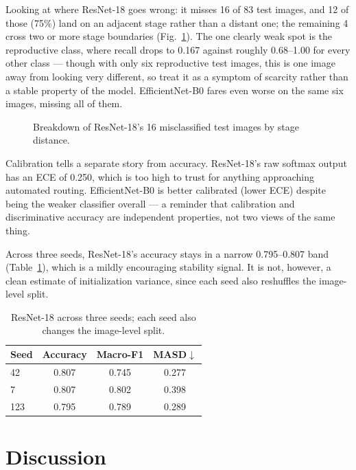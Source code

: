 \documentclass{llncs}
\begin{document}
Looking at where ResNet-18 goes wrong: it misses 16 of 83 test images, and 12 of those (75\%) land on an adjacent stage rather than a distant one; the remaining 4 cross two or more stage boundaries (Fig.~\ref{fig:errors}). The one clearly weak spot is the reproductive class, where recall drops to 0.167 against roughly 0.68--1.00 for every other class — though with only six reproductive test images, this is one image away from looking very different, so treat it as a symptom of scarcity rather than a stable property of the model. EfficientNet-B0 fares even worse on the same six images, missing all of them.

\begin{figure}[t]
\centering
\resizebox{0.5\textwidth}{!}{}
\caption{Breakdown of ResNet-18's 16 misclassified test images by stage distance.}
\label{fig:errors}
\end{figure}

Calibration tells a separate story from accuracy. ResNet-18's raw softmax output has an ECE of 0.250, which is too high to trust for anything approaching automated routing. EfficientNet-B0 is better calibrated (lower ECE) despite being the weaker classifier overall — a reminder that calibration and discriminative accuracy are independent properties, not two views of the same thing.

Across three seeds, ResNet-18's accuracy stays in a narrow 0.795--0.807 band (Table~\ref{tab:seeds}), which is a mildly encouraging stability signal. It is not, however, a clean estimate of initialization variance, since each seed also reshuffles the image-level split.

\begin{table}[t]
\centering
\caption{ResNet-18 across three seeds; each seed also changes the image-level split.}
\label{tab:seeds}
\begin{tabular}{lccc}
\toprule
\textbf{Seed} & \textbf{Accuracy} & \textbf{Macro-F1} & \textbf{MASD}$\downarrow$ \\
\midrule
42  & 0.807 & 0.745 & 0.277 \\
7   & 0.807 & 0.802 & 0.398 \\
123 & 0.795 & 0.789 & 0.289 \\
\bottomrule
\end{tabular}
\end{table}

\section{Discussion}
\end{document}

